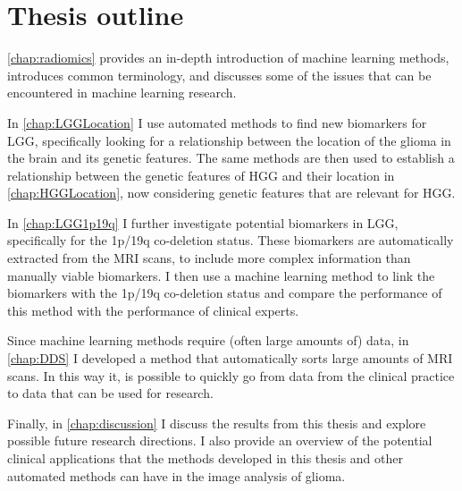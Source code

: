 \section{Thesis outline}

\cref{chap:radiomics} provides an in-depth introduction of machine learning methods, introduces common terminology, and discusses some of the issues that can be encountered in machine learning research.

In \cref{chap:LGGLocation} I use automated methods to find new biomarkers for \gls{LGG}, specifically looking for a relationship between the location of the glioma in the brain and its genetic features.
The same methods are then used to establish a relationship between the genetic features of \gls{HGG} and their location in \cref{chap:HGGLocation}, now considering genetic features that are relevant for \gls{HGG}.

In \cref{chap:LGG1p19q} I further investigate potential biomarkers in \gls{LGG}, specifically for the 1p/19q co-deletion status.
These biomarkers are automatically extracted from the \gls{MRI} scans, to include more complex information than manually viable biomarkers.
I then use a machine learning method to link the biomarkers with the 1p/19q co-deletion status and compare the performance of this method with the performance of clinical experts.

Since machine learning methods require (often large amounts of) data, in \cref{chap:DDS} I developed a method that automatically sorts large amounts of \gls{MRI} scans.
In this way it, is possible to quickly go from data from the clinical practice to data that can be used for research.

Finally, in \cref{chap:discussion} I discuss the results from this thesis and explore possible future research directions.
I also provide an overview of the potential clinical applications that the methods developed in this thesis and other automated methods can have in the image analysis of glioma.

